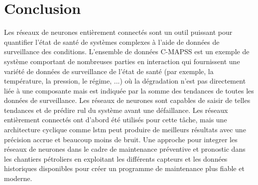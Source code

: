 \section{Conclusion}
Les réseaux de neurones entièrement connectés sont un outil puissant pour quantifier l'état de santé de systèmes complexes à l'aide de données de surveillance des conditions. L'ensemble de données C-MAPSS est un exemple de système comportant de nombreuses parties en interaction qui fournissent une variété de données de surveillance de l'état de santé (par exemple, la température, la pression, le régime, ...) où la dégradation n'est pas directement liée à une composante mais est indiquée par la somme des tendances de toutes les données de surveillance. Les réseaux de neurones sont capables de saisir de telles tendances et de prédire \acrshort{rul} du système avant une défaillance. Les réseaux entièrement connectés ont d'abord été utilisés pour cette tâche, mais une architecture cyclique comme \acrshort{lstm} peut produire de meilleurs résultats avec une précision accrue et beaucoup moins de bruit. Une approche pour integrer les réseaux de neurones dans le cadre de maintenance préventive et pronostic dans les chantiers pétroliers en exploitant les différents capteurs et les données historiques disponibles pour créer un programme de maintenance plus fiable et moderne.

